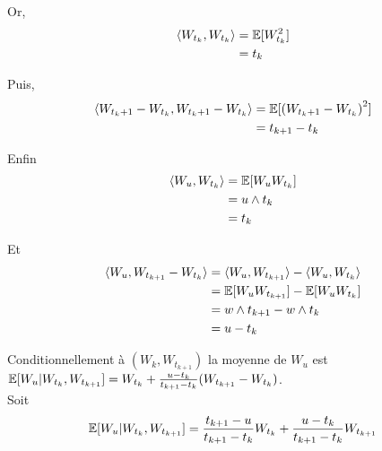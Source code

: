 Or, 
\newcommand{\wtk}{W_{t_k}}
\newcommand{\wu}{W_{u}}
\newcommand{\wtkp}{W_{t_k+1}}
\begin{equation*}
\begin{split}
  \langle \wtk, \wtk \rangle &= \E[\wtk^2] \\
  &= t_k
\end{split}
\end{equation*}

Puis,
\begin{equation*}
\begin{split}
  \langle \wtkp - \wtk, \wtkp - \wtk \rangle &= \E[\left( \wtkp - \wtk \right)^2] \\
  &= t_{k+1} - t_k
\end{split}
\end{equation*}

Enfin
\begin{equation*}
\begin{split}
  \langle \wu , \wtk \rangle &= \E[\wu \wtk] \\
  &= u \wedge t_k \\
  &= t_k
\end{split}
\end{equation*}

Et 
\begin{equation*}
\begin{split}
  \langle \wu, W_{t_{k+1}} - W_{t_k} \rangle &= \langle \wu, W_{t_{k+1}} \rangle - \langle W_u, W_{t_k} \rangle \\
  &= \E[W_u W_{t_{k+1}}] - \E[W_u W_{t_k}] \\
  &= w \wedge t_{k+1} - w \wedge t_k \\
  &= u - t_k
\end{split}
\end{equation*}

Conditionnellement à $(W_k, W_{t_{k+1}})$ la moyenne de $W_u$ est $\mathbb{E}[W_u \vert W_{t_k}, W_{t_{k+1}}] = W_{t_k} + \frac{u-t_k}{t_{k+1} - t_k}(W_{t_{k+1}} - W_{t_k})$. \\

Soit 
\begin{equation*}
\begin{split}
  \mathbb{E}[W_u \vert W_{t_k}, W_{t_{k+1}}] = \frac{t_{k+1} - u}{t_{k+1} - t_k} W_{t_k} + \frac{u - t_k}{t_{k+1} -t_k} W_{t_{k+1}}
\end{split}
\end{equation*}

